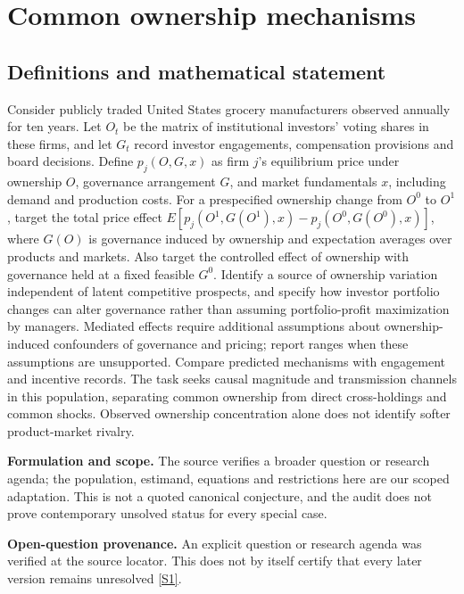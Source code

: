 \documentclass[11pt]{article}
\newcommand{\sref}[2]{\hyperlink{source:#1:#2}{[S#2]}}
\begin{document}
\section*{Common ownership mechanisms}\label{30007679}
\subsection{Definitions and mathematical statement}
Consider publicly traded United States grocery manufacturers observed annually for ten years. Let \(O_t\) be the matrix of institutional investors' voting shares in these firms, and let \(G_t\) record investor engagements, compensation provisions and board decisions. Define \(p_j(O,G,x)\) as firm \(j\)'s equilibrium price under ownership \(O\), governance arrangement \(G\), and market fundamentals \(x\), including demand and production costs. For a prespecified ownership change from \(O^0\) to \(O^1\), target the total price effect \(E[p_j(O^1,G(O^1),x)-p_j(O^0,G(O^0),x)]\), where \(G(O)\) is governance induced by ownership and expectation averages over products and markets. Also target the controlled effect of ownership with governance held at a fixed feasible \(G^0\). Identify a source of ownership variation independent of latent competitive prospects, and specify how investor portfolio changes can alter governance rather than assuming portfolio-profit maximization by managers. Mediated effects require additional assumptions about ownership-induced confounders of governance and pricing; report ranges when these assumptions are unsupported. Compare predicted mechanisms with engagement and incentive records. The task seeks causal magnitude and transmission channels in this population, separating common ownership from direct cross-holdings and common shocks. Observed ownership concentration alone does not identify softer product-market rivalry.

\par\textbf{Formulation and scope.} The source verifies a broader question or research agenda; the population, estimand, equations and restrictions here are our scoped adaptation. This is not a quoted canonical conjecture, and the audit does not prove contemporary unsolved status for every special case.

\par\textbf{Open-question provenance.} An explicit question or research agenda was verified at the source locator. This does not by itself certify that every later version remains unresolved \sref{30007679}{1}.
\end{document}

